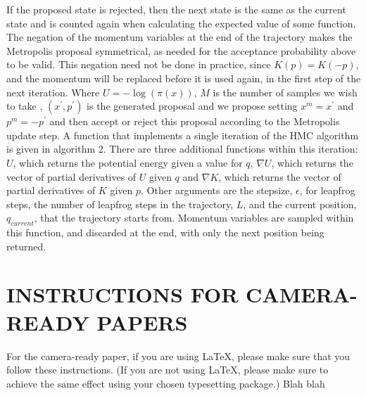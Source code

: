 \documentclass[twoside]{article}
\begin{document}
If the proposed state is rejected, then the next state is the same as the current state and is counted again when calculating the expected value of some function. 
The negation of the momentum variables at the end of the trajectory makes the Metropolis proposal symmetrical, as needed for the acceptance probability above to be valid. This negation need not be done in practice, since $K(p) = K(-p)$, and the momentum will be replaced before it is used again, in the first step of the next iteration.
Where $U = -\log(\pi(x))$,  $M$ is the number of samples we wish to take , $(x^{'}, p^{'})$ is the generated proposal and we propose setting $x^{m} = x^{'}$ and $p^{m} = -p^{'}$ and then accept or reject this proposal according to the Metropolis update step. 
A function that implements a single iteration of the HMC algorithm is given in algorithm 2. There are three additional functions within this iteration: $U$, which returns the potential energy given a value for $q$,  $\nabla U$, which returns the vector of partial derivatives of $U$ given $q$ and $\nabla K$, which returns the vector of partial derivatives of $K$ given $p$. Other arguments are the stepsize, $\epsilon$, for leapfrog steps, the number of leapfrog steps in the trajectory, $L$, and the current position, $q_{current}$, that the trajectory starts from. Momentum variables are sampled within this function, and discarded at the end, with only the next position being returned. 



\section{INSTRUCTIONS FOR CAMERA-READY PAPERS}

For the camera-ready paper, if you are using \LaTeX, please make sure
that you follow these instructions.  (If you are not using \LaTeX,
please make sure to achieve the same effect using your chosen
typesetting package.) Blah blah
\end{document}
